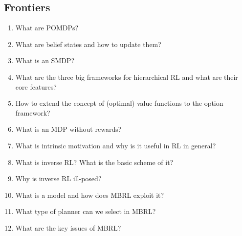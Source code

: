		\subsection{Frontiers}
			\begin{enumerate}
				\item What are \acp{POMDP}?
				\item What are belief states and how to update them?
				\item What is an \ac{SMDP}?
				\item What are the three big frameworks for hierarchical \ac{RL} and what are their core features?
				\item How to extend the concept of (optimal) value functions to the option framework?
				\item What is an \ac{MDP} without rewards?
				\item What is intrinsic motivation and why is it useful in \ac{RL} in general?
				\item What is inverse \ac{RL}? What is the basic scheme of it?
				\item Why is inverse \ac{RL} ill-posed?
				\item What is a model and how does \ac{MBRL} exploit it?
				\item What type of planner can we select in \ac{MBRL}?
				\item What are the key issues of \ac{MBRL}?
			\end{enumerate}
